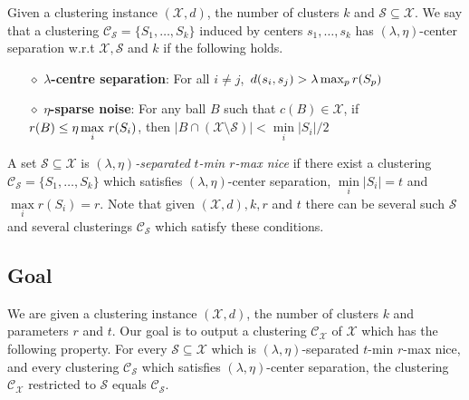 \documentclass[11pt]{article}
\newcommand{\mc}{\mathcal}
\begin{document}
\begin{definition}
Given a clustering instance $(\mc X, d)$, the number of clusters $k$ and $\mc S \subseteq \mc X$. We say that a clustering $\mc C_{\mc S} = \{S_1, \ldots, S_k\}$ induced by centers $s_1, \ldots, s_k$ has $(\lambda, \eta)$-center separation w.r.t $\mc X, \mc S$ and $k$ if the following holds.

\begin{itemize}[nolistsep, noitemsep]
\label{defn:lambdacsnoise}	

\item[$\diamond$] {\bf $\lambda$-centre separation}: For all $i\neq j$, $\thinspace d(s_i, s_j) > \lambda \max_{p} r(S_p)$
\item[$\diamond$]{\bf $\eta$-sparse noise}: For any ball $B$ such that $c(B)\in \mathcal{X}$, if $r(B)\leq \eta\max\limits_{i} \thinspace r(S_i)$, then $|B\cap (\mc X\setminus \mc S)| < \min\limits_{i} |S_i|/2$
\end{itemize}
\end{definition}

\noindent A set $\mc S \subseteq \mc X$ is {\it $(\lambda, \eta)$-separated} {\it $t$-min $r$-max nice} if there exist a clustering $\mc C_{\mc S}=\{S_1,\ldots,S_k\}$ which satisfies $(\lambda, \eta)$-center separation,  $\min\limits_{i} \lvert S_i\rvert = t$ and $\max\limits_{i} r(S_i) = r$. Note that given $(\mc X, d), k, r$ and $t$ there can be several such $\mc S$ and several clusterings $\mc C_{\mc S}$ which satisfy these conditions.


\subsection{Goal}
We are given a clustering instance $(\mc X, d)$, the number of clusters $k$ and parameters $r$ and $t$. Our goal is to output a clustering $\mc C_{\mc X}$ of $\mc X$ which has the following property. For every $\mc S \subseteq \mc X$ which is $(\lambda, \eta)$-separated $t$-min $r$-max nice, and every clustering $\mc C_{\mc S}$ which satisfies $(\lambda, \eta)$-center separation, the clustering $\mc C_{\mc X}$ restricted to $\mc S$ equals $\mc C_{\mc S}$. 
\end{document}
